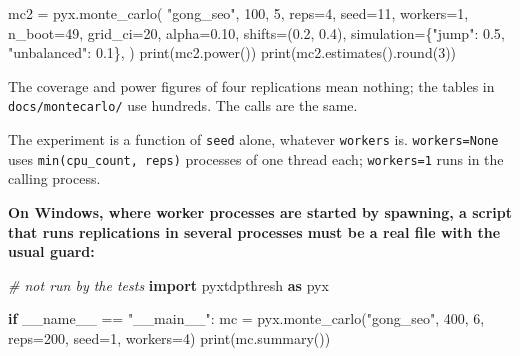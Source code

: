 \documentclass[
  10.5pt,
  a4paper,
]{article}
\newenvironment{Shaded}{}{}
\newcommand{\BuiltInTok}[1]{\textcolor[rgb]{0.00,0.50,0.00}{#1}}
\newcommand{\CommentTok}[1]{\textcolor[rgb]{0.38,0.63,0.69}{\textit{#1}}}
\newcommand{\ControlFlowTok}[1]{\textcolor[rgb]{0.00,0.44,0.13}{\textbf{#1}}}
\newcommand{\DecValTok}[1]{\textcolor[rgb]{0.25,0.63,0.44}{#1}}
\newcommand{\FloatTok}[1]{\textcolor[rgb]{0.25,0.63,0.44}{#1}}
\newcommand{\ImportTok}[1]{\textcolor[rgb]{0.00,0.50,0.00}{\textbf{#1}}}
\newcommand{\NormalTok}[1]{#1}
\newcommand{\OperatorTok}[1]{\textcolor[rgb]{0.40,0.40,0.40}{#1}}
\newcommand{\StringTok}[1]{\textcolor[rgb]{0.25,0.44,0.63}{#1}}
\newcommand{\VariableTok}[1]{\textcolor[rgb]{0.10,0.09,0.49}{#1}}
\begin{document}
\begin{Shaded}
\begin{Highlighting}[]
\NormalTok{mc2 }\OperatorTok{=}\NormalTok{ pyx.monte\_carlo(}
    \StringTok{"gong\_seo"}\NormalTok{,}
    \DecValTok{100}\NormalTok{,}
    \DecValTok{5}\NormalTok{,}
\NormalTok{    reps}\OperatorTok{=}\DecValTok{4}\NormalTok{,}
\NormalTok{    seed}\OperatorTok{=}\DecValTok{11}\NormalTok{,}
\NormalTok{    workers}\OperatorTok{=}\DecValTok{1}\NormalTok{,}
\NormalTok{    n\_boot}\OperatorTok{=}\DecValTok{49}\NormalTok{,}
\NormalTok{    grid\_ci}\OperatorTok{=}\DecValTok{20}\NormalTok{,}
\NormalTok{    alpha}\OperatorTok{=}\FloatTok{0.10}\NormalTok{,}
\NormalTok{    shifts}\OperatorTok{=}\NormalTok{(}\FloatTok{0.2}\NormalTok{, }\FloatTok{0.4}\NormalTok{),}
\NormalTok{    simulation}\OperatorTok{=}\NormalTok{\{}\StringTok{"jump"}\NormalTok{: }\FloatTok{0.5}\NormalTok{, }\StringTok{"unbalanced"}\NormalTok{: }\FloatTok{0.1}\NormalTok{\},}
\NormalTok{)}
\BuiltInTok{print}\NormalTok{(mc2.power())}
\BuiltInTok{print}\NormalTok{(mc2.estimates().}\BuiltInTok{round}\NormalTok{(}\DecValTok{3}\NormalTok{))}
\end{Highlighting}
\end{Shaded}

The coverage and power figures of four replications mean nothing; the
tables in \texttt{docs/montecarlo/} use hundreds. The calls are the
same.

The experiment is a function of \texttt{seed} alone, whatever
\texttt{workers} is. \texttt{workers=None} uses
\texttt{min(cpu\_count,\ reps)} processes of one thread each;
\texttt{workers=1} runs in the calling process.

\textbf{On Windows, where worker processes are started by spawning, a
script that runs replications in several processes must be a real file
with the usual guard:}

\begin{Shaded}
\begin{Highlighting}[]
\CommentTok{\# not run by the tests}
\ImportTok{import}\NormalTok{ pyxtdpthresh }\ImportTok{as}\NormalTok{ pyx}

\ControlFlowTok{if} \VariableTok{\_\_name\_\_} \OperatorTok{==} \StringTok{"\_\_main\_\_"}\NormalTok{:}
\NormalTok{    mc }\OperatorTok{=}\NormalTok{ pyx.monte\_carlo(}\StringTok{"gong\_seo"}\NormalTok{, }\DecValTok{400}\NormalTok{, }\DecValTok{6}\NormalTok{, reps}\OperatorTok{=}\DecValTok{200}\NormalTok{, seed}\OperatorTok{=}\DecValTok{1}\NormalTok{, workers}\OperatorTok{=}\DecValTok{4}\NormalTok{)}
    \BuiltInTok{print}\NormalTok{(mc.summary())}
\end{Highlighting}
\end{Shaded}
\end{document}

